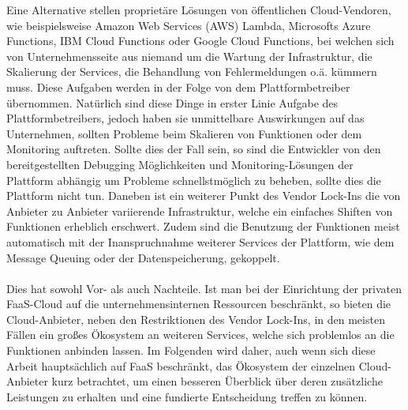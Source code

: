\documentclass[11pt]{article}
\begin{document}
Eine Alternative stellen proprietäre Lösungen von öffentlichen Cloud-Vendoren, wie beispielsweise Amazon Web Services (AWS) Lambda, Microsofts Azure Functions, IBM Cloud Functions oder Google Cloud Functions, bei welchen sich von Unternehmensseite aus niemand um die Wartung der Infrastruktur, die Skalierung der Services, die Behandlung von Fehlermeldungen o.ä. kümmern muss. Diese Aufgaben werden in der Folge von dem Plattformbetreiber übernommen. Natürlich sind diese Dinge in erster Linie Aufgabe des Plattformbetreibers, jedoch haben sie unmittelbare Auswirkungen auf das Unternehmen, sollten Probleme beim Skalieren von Funktionen oder dem Monitoring auftreten. Sollte dies der Fall sein, so sind die Entwickler von den bereitgestellten Debugging Möglichkeiten und Monitoring-Lösungen der Plattform abhängig um Probleme schnellstmöglich zu beheben, sollte dies die Plattform nicht tun. Daneben ist ein weiterer Punkt des Vendor Lock-Ins die von Anbieter zu Anbieter variierende Infrastruktur, welche ein einfaches Shiften von Funktionen erheblich erschwert. Zudem sind die Benutzung der Funktionen meist automatisch mit der Inanspruchnahme weiterer Services der Plattform, wie dem Message Queuing oder der Datenspeicherung, gekoppelt. \\\\
Dies hat sowohl Vor- als auch Nachteile. Ist man bei der Einrichtung der privaten FaaS-Cloud auf die unternehmensinternen Ressourcen beschränkt, so bieten die Cloud-Anbieter, neben den Restriktionen des Vendor Lock-Ins, in den meisten Fällen ein großes Ökosystem an weiteren Services, welche sich problemlos an die Funktionen anbinden lassen. Im Folgenden wird daher, auch wenn sich diese Arbeit hauptsächlich auf FaaS beschränkt, das Ökosystem der einzelnen Cloud-Anbieter kurz betrachtet, um einen besseren Überblick über deren zusätzliche Leistungen zu erhalten und eine fundierte Entscheidung treffen zu können.
\end{document}
